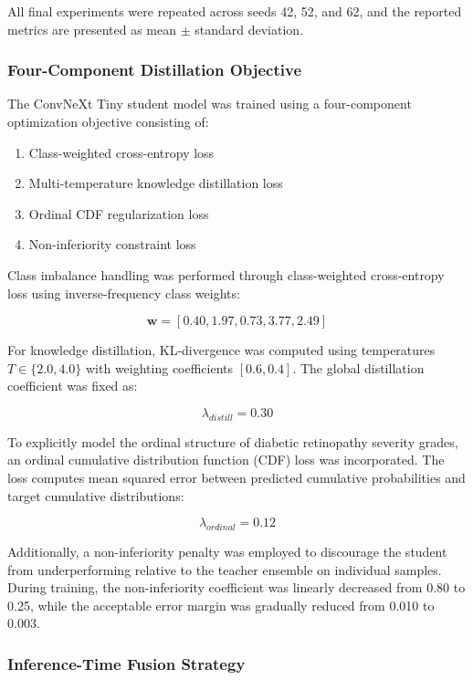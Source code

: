 \documentclass[a4paper,fleqn]{cas-dc}
\begin{document}
All final experiments were repeated across seeds 42, 52, and 62, and the reported metrics are presented as mean $\pm$ standard deviation.

\subsubsection{Four-Component Distillation Objective}

The ConvNeXt Tiny student model was trained using a four-component optimization objective consisting of:

\begin{enumerate}
\item Class-weighted cross-entropy loss
\item Multi-temperature knowledge distillation loss
\item Ordinal CDF regularization loss
\item Non-inferiority constraint loss
\end{enumerate}

Class imbalance handling was performed through class-weighted cross-entropy loss using inverse-frequency class weights:

\[
\mathbf{w} = [0.40, 1.97, 0.73, 3.77, 2.49]
\]

For knowledge distillation, KL-divergence was computed using temperatures $T \in \{2.0, 4.0\}$ with weighting coefficients $[0.6, 0.4]$. The global distillation coefficient was fixed as:

\[
\lambda_{distill} = 0.30
\]

To explicitly model the ordinal structure of diabetic retinopathy severity grades, an ordinal cumulative distribution function (CDF) loss was incorporated. The loss computes mean squared error between predicted cumulative probabilities and target cumulative distributions:

\[
\lambda_{ordinal} = 0.12
\]

Additionally, a non-inferiority penalty was employed to discourage the student from underperforming relative to the teacher ensemble on individual samples. During training, the non-inferiority coefficient was linearly decreased from 0.80 to 0.25, while the acceptable error margin was gradually reduced from 0.010 to 0.003.

\subsubsection{Inference-Time Fusion Strategy}
\end{document}

